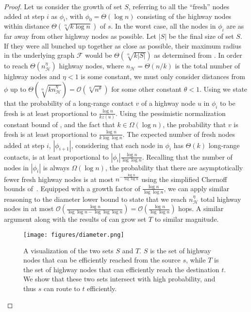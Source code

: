 \begin{proof}
    Let us consider the growth of set $S$, referring to all the ``fresh'' nodes
    added at step $i$ as $\phi_i$, with $\phi_0 = \Theta(\log{n})$ consisting of the
    highway nodes within distance $\Theta(\sqrt[\alpha]{k \log{n}})$ of $s$.
    In the worst case, all the nodes in $\phi_i$ are as far away from other highway
    nodes as possible.
    Let $|S|$ be the final size of set $S$.
    If they were all bunched up together as close as possible, their maximum
    radius in the underlying graph $\mathcal{F}$ would be
    $\Theta(\sqrt[\alpha]{k |S|})$ as determined from
    .
    In order to reach $\Theta(n_\mathcal{H}^\eta)$ highway nodes, where
    $n_\mathcal{H} = \Theta(n / k)$ is the total number of highway nodes and
    $\eta < 1$ is some constant, we must only consider distances from $\phi$ up
    to $\Theta(\sqrt[\alpha]{k n_\mathcal{H}^\eta}) =
    \mathcal{O}(\sqrt[\alpha]{n^\theta})$ for some other constant $\theta < 1$.
    Using  we state that the probability
    of a long-range contact $v$ of a highway node $u$ in $\phi_i$ to be fresh
    is at least proportional to $\frac{\log{n}}{k z(u)}$.
    Using the pessimistic normalization constant bound of
    , and the fact that $k \in \Omega(\log{n})$,
    the probability that $v$ is fresh is at least proportional to
    $\frac{\log{n}}{k \log{\log{n}}}$.
    The expected number of fresh nodes added at step $i$, $|\phi_{i + 1}|$,
    considering that each node in $\phi_i$ has $\Theta(k)$ long-range
    contacts, is at least proportional to $|\phi_i|
    \frac{\log{n}}{\log{\log{n}}}$.
    Recalling that the number of nodes in $|\phi_i|$ is always
    $\Omega(\log{n})$, the probability that there are asymptotically fewer fresh
    highway nodes is at most $n^{-\frac{\log{n}}{\log{\log{n}}}}$ using the
    simplified Chernoff bounds of~\cite{DILLENCOURT2023106397}.
    Equipped with a growth factor of $\frac{\log{n}}{\log{\log{n}}}$, we can
    apply similar reasoning to the diameter lower bound to state that we reach
    $n_\mathcal{H}^\eta$ total highway nodes in at most
    $\mathcal{O}(\frac{\log{n}}{\log{\log{n}} - \log{\log{\log{n}}}}) =
    \mathcal{O}(\frac{\log{n}}{\log{\log{n}}})$ hops.
    A similar argument along with the results of  can
    grow set $T$ to similar magnitude.

    \begin{figure}[t]
        \centering
        \texttt{[image: figures/diameter.png]}
        \caption{
            A visualization of the two sets $S$ and $T$.
            $S$ is the set of highway nodes that can be efficiently reached from
            the source $s$, while $T$ is the set of highway nodes that can
            efficiently reach the destination $t$.
            We show that these two sets intersect with high probability, and
            thus $s$ can route to $t$ efficiently.
        }
        \label{fig:diameter}
        \vspace*{-\medskipamount}
    \end{figure}


\end{proof}
